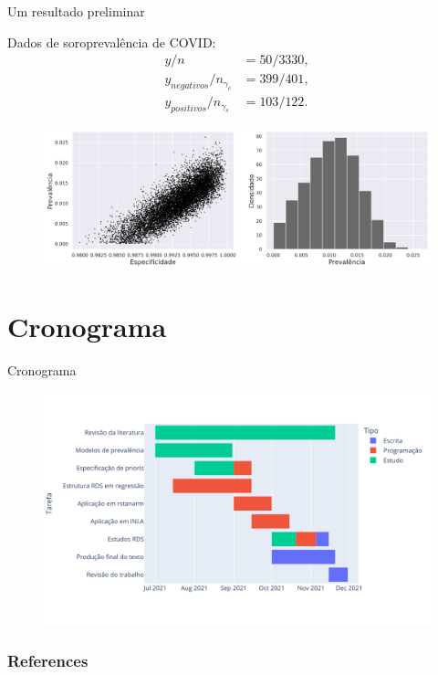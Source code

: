 \documentclass{beamer}
\begin{document}
\begin{frame}{Um resultado preliminar}

  Dados de soroprevalência de COVID:  
  \begin{align*}
    y/n &= 50/3330,\\
  y_{negativos}/n_{\gamma_e} &= 399/401, \\
  y_{positivos}/n_{\gamma_s} &= 103/122.
  \end{align*}
  \begin{figure}
    \centering
    \includegraphics[width=\textwidth]{../../images/model1_gelman_figure.png}
  \end{figure}
  
\end{frame}


\section{Cronograma}

\begin{frame}{Cronograma}

  \begin{figure}
    \centering
    \includegraphics[width = \textwidth]{../../images/gantt-chart-schedule.png}
  \end{figure}
  
\end{frame}


\begin{frame}[t, allowframebreaks]
   \frametitle{References}
   
   \nocite{*}
   
 \end{frame}
\end{document}
